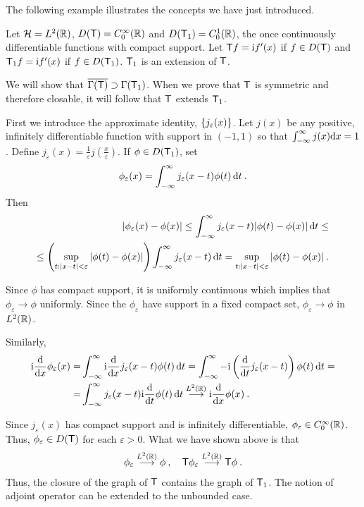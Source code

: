 The following example illustrates the concepts we have just introduced.

\begin{example}
Let $\mathcal{H} = L^{2}(\mathbb{R})$, $D(\mathsf{T}) = C_0^\infty(\mathbb{R})$ and $D(\mathsf{T}_1) = C_0^1(\mathbb{R})$, the once continuously differentiable functions with compact support.
Let $\mathsf{T} f= \mathrm{i} f'(x)$ if $f \in D(\mathsf{T})$ and $\mathsf{T}_1 f= \mathrm{i} f'(x)$ if  $f \in D(\mathsf{T}_1)$. $\mathsf{T}_1$ is an extension of $\mathsf{T}$.

We will show that $\overline{\Gamma(\mathsf{T})} \supset \Gamma(\mathsf{T}_1)$. When we prove that $\mathsf{T}$ is symmetric and therefore closable, it will follow that $\mathsf{T}$ extends $\mathsf{T}_1$. 

First we introduce the approximate identity, $\left \lbrace j_\varepsilon(x) \right \rbrace$. Let $j(x)$ be any positive, infinitely differentiable function with support in $(-1, 1)$ so that $\int_{-\infty}^{\infty} j(x) \mathrm{d} x = 1$. Define $j_\varepsilon(x) = \frac{1}{\varepsilon} j(\frac{x}{\varepsilon})$. If $\phi \in D(\mathsf{T}_1)$, set \begin{align}
    \phi_\varepsilon(x) = \int_{-\infty}^{\infty} j_\varepsilon (x-t) \phi(t) \, \mathrm{d} t \:.
\end{align}
Then \begin{align}
    |\phi_\varepsilon(x) - \phi(x)| \leq \int_{-\infty}^{\infty} j_\varepsilon (x-t) |\phi(t) - \phi(x)| \, \mathrm{d} t\leq \\
    \leq \left( \sup_{t : |x-t| < \varepsilon} |\phi(t) - \phi(x)| \right) \int_{-\infty}^{\infty} j_\varepsilon (x-t) \, \mathrm{d} t=  \sup_{t : |x-t| < \varepsilon} |\phi(t) - \phi(x)| \:. \nonumber
\end{align}


Since $\phi$ has compact support, it is uniformly continuous which implies that $\phi_\varepsilon \rightarrow \phi$ uniformly. Since the $\phi_\varepsilon$ have support in a fixed compact set, $\phi_\varepsilon \rightarrow \phi$ in $L^{2}(\mathbb{R})$.

Similarly,
\begin{align}
    \mathrm{i} \frac{\mathrm{d}}{\mathrm{d}x} \phi_\varepsilon(x) 
    =&
    \int_{-\infty}^{\infty} \mathrm{i} \frac{\mathrm{d}}{\mathrm{d}x} j_\varepsilon (x-t) \phi(t) \, \mathrm{d} t 
    = 
    \int_{-\infty}^{\infty} - \mathrm{i} \left( \frac{\mathrm{d}}{\mathrm{d}t} j_\varepsilon (x-t) \right) \phi(t) \, \mathrm{d} t 
    = \\ =&
    \int_{-\infty}^{\infty} j_\varepsilon(x-t) \mathrm{i} \frac{\mathrm{d}}{\mathrm{d}t} \phi(t) \, \mathrm{d} t 
    \overset{L^{2}(\mathbb{R})} \longrightarrow
     \mathrm{i}  \frac{\mathrm{d}}{\mathrm{d}x} \phi(x) \:. \nonumber
\end{align}

Since $j_\varepsilon(x)$ has compact support and is infinitely differentiable, $\phi_\varepsilon \in C_0^\infty(\mathbb{R})$.
Thus, $\phi_\varepsilon \in D(\mathsf{T})$ for each $\varepsilon >0$. What we have shown above is that \begin{align}
    \phi_\varepsilon\overset{L^{2}(\mathbb{R})} \longrightarrow \phi \:, 
	\quad     
    \mathsf{T} \phi_\varepsilon \overset{L^{2}(\mathbb{R})} \longrightarrow \mathsf{T} \phi \:.
\end{align}
Thus, the closure of the graph of $\mathsf{T}$ contains the graph of $\mathsf{T}_1$. The notion of adjoint operator can be extended to the unbounded case.
\end{example}

